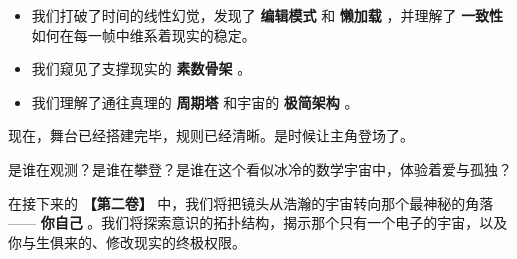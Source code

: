 \begin{itemize}
\item 我们打破了时间的线性幻觉，发现了 \textbf{编辑模式} 和 \textbf{懒加载} ，并理解了 \textbf{一致性} 如何在每一帧中维系着现实的稳定。
\item 我们窥见了支撑现实的 \textbf{素数骨架} 。
\item 我们理解了通往真理的 \textbf{周期塔} 和宇宙的 \textbf{极简架构} 。
\end{itemize}

现在，舞台已经搭建完毕，规则已经清晰。是时候让主角登场了。

是谁在观测？是谁在攀登？是谁在这个看似冰冷的数学宇宙中，体验着爱与孤独？

在接下来的 \textbf{【第二卷】} 中，我们将把镜头从浩瀚的宇宙转向那个最神秘的角落—— \textbf{你自己} 。我们将探索意识的拓扑结构，揭示那个只有一个电子的宇宙，以及你与生俱来的、修改现实的终极权限。

